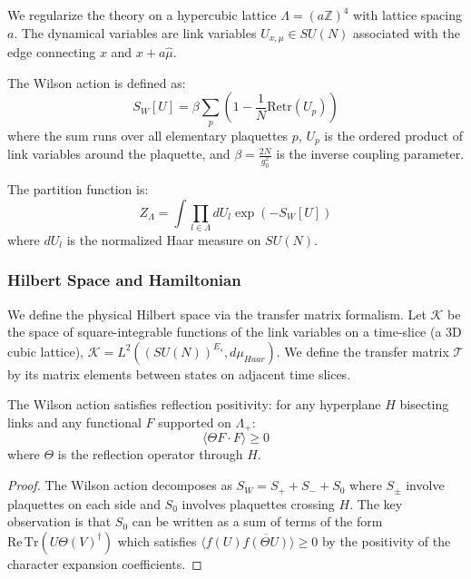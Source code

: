 We regularize the theory on a hypercubic lattice $\Lambda = (a\mathbb{Z})^4$ with lattice spacing $a$. The dynamical variables are link variables $U_{x,\mu} \in SU(N)$ associated with the edge connecting $x$ and $x+a\hat{\mu}$.

\begin{definition}
\label{def:wilson_action}
The Wilson action is defined as:
\begin{equation}
\label{eq:wilson_action}
S_W[U] = \beta \sum_{p} \left( 1 - \frac{1}{N} \text{Re} \text{tr}(U_p) \right)
\end{equation}
where the sum runs over all elementary plaquettes $p$, $U_p$ is the ordered product of link variables around the plaquette, and $\beta = \frac{2N}{g_0^2}$ is the inverse coupling parameter.
\end{definition}

The partition function is:
\begin{equation}
\label{eq:partition}
Z_\Lambda = \int \prod_{l \in \Lambda} dU_l \exp(-S_W[U])
\end{equation}
where $dU_l$ is the normalized Haar measure on $SU(N)$.

\subsubsection{Hilbert Space and Hamiltonian}
We define the physical Hilbert space via the transfer matrix formalism. Let $\mathcal{K}$ be the space of square-integrable functions of the link variables on a time-slice (a 3D cubic lattice), $\mathcal{K} = L^2((SU(N))^{E_s}, d\mu_{Haar})$.
We define the transfer matrix $\mathcal{T}$ by its matrix elements between states on adjacent time slices.

\begin{theorem}
\label{thm:rp_wilson}
The Wilson action satisfies reflection positivity: for any hyperplane $H$ bisecting links and any functional $F$ supported on $\Lambda_+$:
\begin{equation}
\langle \Theta F \cdot F \rangle \geq 0
\end{equation}
where $\Theta$ is the reflection operator through $H$.
\end{theorem}

\begin{proof}
The Wilson action decomposes as $S_W = S_+ + S_- + S_0$ where $S_\pm$ involve plaquettes on each side and $S_0$ involves plaquettes crossing $H$. The key observation is that $S_0$ can be written as a sum of terms of the form $\mathrm{Re}\,\mathrm{Tr}(U \Theta(V)^\dagger)$ which satisfies $\langle f(U) \overline{f(\Theta U)} \rangle \geq 0$ by the positivity of the character expansion coefficients.
\end{proof}

